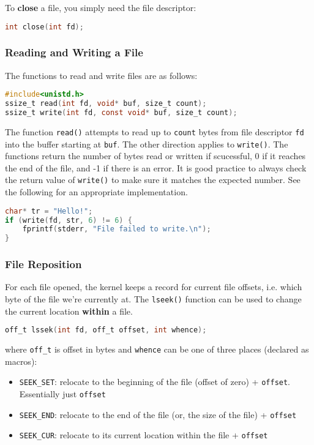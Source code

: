 \documentclass{article}
\newcommand{\bold}[1]{\textbf{#1}}
\renewcommand{\b}{\item[$\circ$]}
\newcommand{\newlist}{\begin{itemize}}
\renewcommand{\endlist}{\end{itemize}}
\newcommand{\code}[1]{\texttt{#1}}
\begin{document}
To \bold{close} a file, you simply need the file descriptor:

\begin{lstlisting}[language=C]
int close(int fd);
\end{lstlisting}

\subsubsection{Reading and Writing a File}

The functions to read and write files are as follows: 

\begin{lstlisting}[language=C]
#include<unistd.h>
ssize_t read(int fd, void* buf, size_t count);
ssize_t write(int fd, const void* buf, size_t count);
\end{lstlisting}

The function \code{read()} attempts to read up to \code{count} bytes from file descriptor \code{fd} into the buffer starting at \code{buf}. The other direction applies to \code{write()}. The functions return the number of bytes read or written if scucessful, 0 if it reaches the end of the file, and -1 if there is an error. It is good practice to always check the return value of \code{write()} to make sure it matches the expected number. See the following for an appropriate implementation.

\begin{lstlisting}[language=C]
char* tr = "Hello!";
if (write(fd, str, 6) != 6) { 
    fprintf(stderr, "File failed to write.\n");
}
\end{lstlisting}

\subsubsection{File Reposition}

For each file opened, the kernel keeps a record for current file offsets, i.e. which byte of the file we're currently at. The \code{lseek()} function can be used to change the current location \bold{within} a file.

\begin{lstlisting}[language=C]
off_t lssek(int fd, off_t offset, int whence);
\end{lstlisting}

where \code{off\_t} is offset in bytes and \code{whence} can be one of three places (declared as macros):

\newlist
\b \code{SEEK\_SET}: relocate to the beginning of the file (offset of zero) + \code{offset}. Essentially just \code{offset}
\b \code{SEEK\_END}: relocate to the end of the file (or, the size of the file) + \code{offset}
\b \code{SEEK\_CUR}: relocate to its current location within the file + \code{offset}
\endlist
\end{document}
